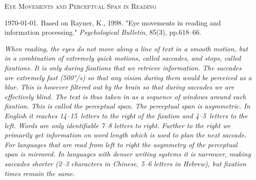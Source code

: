 \documentclass[oneside]{article}
\def\fixcolor{blue!30!gray}
\def\saccolor{red!50!gray}
\begin{document}
\centerline{\Huge 
\scshape Eye Movements and Perceptual Span in Reading
}

\bigskip
\centerline{\today. Based on Rayner, K., 1998. "Eye movements in reading and information processing."  \textit{Psychological Bulletin}, 85(3), pp.618--66.}

\bigskip



\begin{multicols}{3}
  \setlength\parfillskip{0pt}
  \setlength\emergencystretch{40pt}
\itshape
When reading, the eyes do not move along a line of text in a smooth motion, but in a combination of extremely quick motions, called \textcolor{\saccolor}{\mbox{saccades}}, and stops, called \textcolor{\fixcolor}{\mbox{fixations}}. It is only during fixations that we retrieve information. The saccades are extremely fast (500°/s) so that any vision during them would be perceived as a blur. This is however filtered out by the brain so that during saccades we are effectively blind. The text is thus taken in as a sequence of windows around each fixation. This is called the perceptual span. The perceptual span is asymmetric. In English it reaches 14--15~letters to the right of the fixation and 4--5~letters to the left. Words are only identifiable 7--8 letters to right. Further to the right we primarily get information on word length which is used to plan the next saccade. For languages that are read from left to right the asymmetry of the perceptual span is mirrored. In languages with denser writing systems it is narrower, making saccades shorter (2--3 characters in Chinese, 5--6 letters in Hebrew), but fixation times remain the same. 
\end{multicols}


\vspace{3.5cm}
\end{document}
